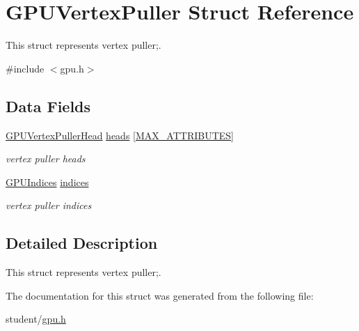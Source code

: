 \hypertarget{structGPUVertexPuller}{}\section{G\+P\+U\+Vertex\+Puller Struct Reference}
\label{structGPUVertexPuller}


This struct represents vertex puller;.  




{\ttfamily \#include $<$gpu.\+h$>$}

\subsection*{Data Fields}
\begin{DoxyCompactItemize}
\item 
\mbox{\label{structGPUVertexPuller_ac7e5148aa34148e88bbe2f8763d496ab}} 
\hyperlink{structGPUVertexPullerHead}{G\+P\+U\+Vertex\+Puller\+Head} \hyperlink{structGPUVertexPuller_ac7e5148aa34148e88bbe2f8763d496ab}{heads} \mbox{[}\hyperlink{student_2fwd_8h_a4d992a1f9192388588184753115f6c03}{M\+A\+X\+\_\+\+A\+T\+T\+R\+I\+B\+U\+T\+ES}\mbox{]}
\begin{DoxyCompactList}\small\item\em vertex puller heads \end{DoxyCompactList}\item 
\mbox{\label{structGPUVertexPuller_a043bd88d5a8baa834418369b993a01b6}} 
\hyperlink{structGPUIndices}{G\+P\+U\+Indices} \hyperlink{structGPUVertexPuller_a043bd88d5a8baa834418369b993a01b6}{indices}
\begin{DoxyCompactList}\small\item\em vertex puller indices \end{DoxyCompactList}\end{DoxyCompactItemize}


\subsection{Detailed Description}
This struct represents vertex puller;. 

The documentation for this struct was generated from the following file\+:\begin{DoxyCompactItemize}
\item 
student/\hyperlink{gpu_8h}{gpu.\+h}\end{DoxyCompactItemize}

